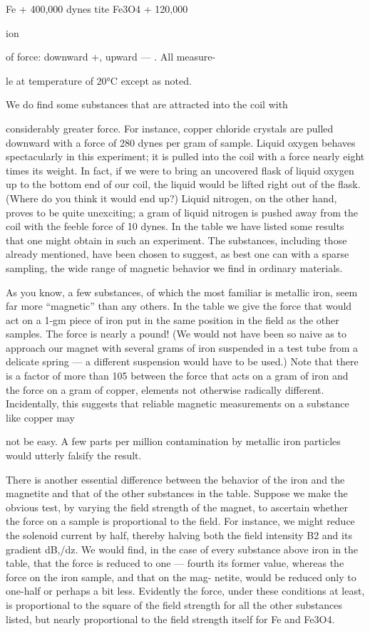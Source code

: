 {Fe + 400,000 dynes
tite Fe3O4 + 120,000

ion

of force: downward +, upward  --- . All measure-

le at temperature of 20°C except as noted.

We do find some substances that are attracted into the coil with

considerably greater force. For instance, copper chloride crystals
are pulled downward with a force of 280 dynes per gram of sample.
Liquid oxygen behaves spectacularly in this experiment; it is pulled
into the coil with a force nearly eight times its weight. In fact, if we
were to bring an uncovered flask of liquid oxygen up to the bottom
end of our coil, the liquid would be lifted right out of the flask.
(Where do you think it would end up?) Liquid nitrogen, on the
other hand, proves to be quite unexciting; a gram of liquid nitrogen
is pushed away from the coil with the feeble force of 10 dynes. In the
table we have listed some results that one might obtain in such an
experiment. The substances, including those already mentioned,
have been chosen to suggest, as best one can with a sparse sampling,
the wide range of magnetic behavior we find in ordinary materials.

As you know, a few substances, of which the most familiar is
metallic iron, seem far more ``magnetic'' than any others. In the
table we give the force that would act on a 1-gm piece of iron put in
the same position in the field as the other samples. The force is
nearly a pound! (We would not have been so naive as to approach
our magnet with several grams of iron suspended in a test tube from
a delicate spring --- a different suspension would have to be used.)
Note that there is a factor of more than 105 between the force that
acts on a gram of iron and the force on a gram of copper, elements
not otherwise radically different. Incidentally, this suggests that
reliable magnetic measurements on a substance like copper may

not be easy. A few parts per million contamination by metallic iron
particles would utterly falsify the result.

There is another essential difference between the behavior of the
iron and the magnetite and that of the other substances in the table.
Suppose we make the obvious test, by varying the field strength of
the magnet, to ascertain whether the force on a sample is proportional
to the field. For instance, we might reduce the solenoid current
by half, thereby halving both the field intensity B2 and its gradient
dB,/dz. We would find, in the case of every substance above
iron in the table, that the force is reduced to one --- fourth its former
value, whereas the force on the iron sample, and that on the mag-
netite, would be reduced only to one-half or perhaps a bit less.
Evidently the force, under these conditions at least, is proportional
to the square of the field strength for all the other substances listed,
but nearly proportional to the field strength itself for Fe and Fe3O4.

}
